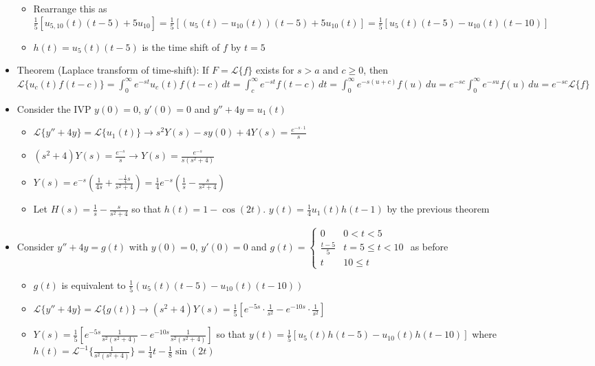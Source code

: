 \documentclass[12pt]{article}
\begin{document}
\begin{itemize}
\begin{itemize}
         \item Rearrange this as $\frac{1}{5} \left[ u_{5,10} (t) (t-5) + 5 u_{10} \right]  = \frac{1}{5} \left[ (u_5(t) - u_{10}(t))(t-5) + 5 u_{10} (t) \right] = \frac{1}{5} \left[ u_5(t) (t-5) - u_{10} (t) (t-10) \right]$
         \item $h(t) = u_5(t) (t-5)$ is the time shift of $f$ by $t = 5$
     \end{itemize}
     \item Theorem (Laplace transform of time-shift): If $F = \mathcal{L} \{f\}$ exists for $s > a$ and $c \geq 0$, then $\mathcal{L} \{ u_c(t) f(t-c) \} = \int_{0}^{\infty} e^{-st} u_c(t) f(t-c) \, dt = \int_{c}^{\infty} e^{-st} f(t-c) \, dt = \int_{0}^{\infty} e^{-s(u+c)} f(u) \, du = e^{-sc} \int_{0}^{\infty} e^{-su} f(u) \, du = e^{-sc} \mathcal{L} \{f\}$
     \item Consider the IVP $y(0) = 0$, $y'(0) = 0$ and $y'' + 4y = u_1(t)$ \begin{itemize}
         \item $\mathcal{L} \{y'' + 4y \} = \mathcal{L} \{ u_1(t) \} \rightarrow s^2Y(s) - sy(0) + 4Y(s) = \frac{e^{-s \cdot 1}}{s}$
         \item $(s^2 + 4) Y(s) = \frac{e^{-s}}{s} \rightarrow Y(s) = \frac{e^{-s}}{s(s^2+4)}$
         \item $Y(s) = e^{-s} \left( \frac{1}{4s} + \frac{-\frac{1}{4}s}{s^2+4} \right) = \frac{1}{4} e^{-s} \left( \frac{1}{s} - \frac{s}{s^2+4} \right)$ 
         \item Let $H(s) = \frac{1}{s} - \frac{s}{s^2+4}$ so that $h(t) = 1 - \cos (2t)$. $y(t) = \frac{1}{4} u_1(t) h(t-1)$ by the previous theorem 
     \end{itemize}
     \item Consider $y'' + 4y = g(t)$ with $y(0) = 0$, $y'(0) = 0$ and $g(t) = \begin{cases} 
        0 & 0 < t < 5 \\
        \frac{t-5}{5} & t = 5 \leq t < 10 \\
        t & 10 \leq t \end{cases}$ as before \begin{itemize}
            \item $g(t)$ is equivalent to $\frac{1}{5} ( u_5(t) (t-5) - u_{10}(t)(t-10))$
            \item $\mathcal{L} \{y'' + 4y \} = \mathcal{L} \{g(t) \} \rightarrow (s^2+4)Y(s) = \frac{1}{5} \left[ e^{-5s} \cdot \frac{1}{s^2} - e^{-10s} \cdot \frac{1}{s^2} \right]$
            \item $Y(s) = \frac{1}{5} \left[ e^{-5s} \frac{1}{s^2(s^2+4)} - e^{-10s} \frac{1}{s^2(s^2+4)} \right]$ so that $y(t) = \frac{1}{5} \left[ u_5(t) h(t-5) - u_{10}(t) h(t-10) \right]$ where $h(t) = \mathcal{L}^{-1} \{ \frac{1}{s^2(s^2+4)} \} = \frac{1}{4} t - \frac{1}{8} \sin(2t)$
        \end{itemize}
\end{itemize}
\end{document}

